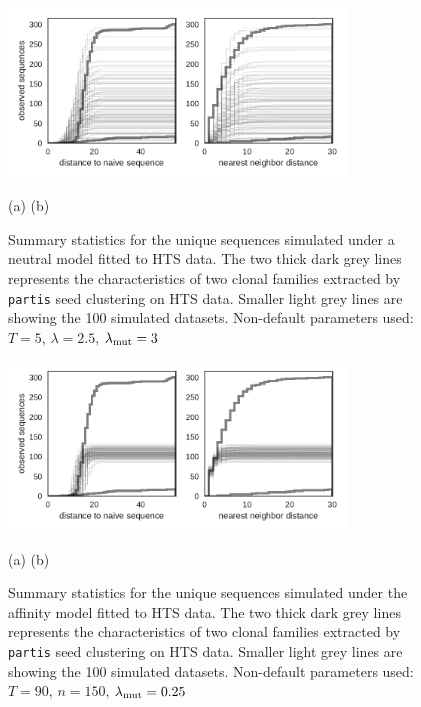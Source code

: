 \begin{figure}[!ht]
    \begin{center}
    \includegraphics[width=0.8\textwidth]{figures/Laura-neutsim_Laura-data.pdf}\newline%
    \end{center}
    \vspace{-14mm} \hspace{44mm} (a) \hspace{50mm} (b)
    \caption{
        \label{fig:Laura-neutsim_Laura-data}
        Summary statistics for the unique sequences simulated under a neutral model fitted to HTS data.
        The two thick dark grey lines represents the characteristics of two clonal families extracted by \texttt{partis} seed clustering on HTS data.
        Smaller light grey lines are showing the 100 simulated datasets.
        Non-default parameters used: $T=5$, $\lambda=2.5$, $\lambda_{\text{mut}}=3$
    }
\end{figure}
\clearpage
\begin{figure}[!ht]
    \begin{center}
    \includegraphics[width=0.8\textwidth]{figures/Laura-affsim_Laura-data.pdf}\newline%
    \end{center}
    \vspace{-14mm} \hspace{44mm} (a) \hspace{50mm} (b)
    \caption{
        \label{fig:Laura-affsim_Laura-data}
        Summary statistics for the unique sequences simulated under the affinity model fitted to HTS data.
        The two thick dark grey lines represents the characteristics of two clonal families extracted by \texttt{partis} seed clustering on HTS data.
        Smaller light grey lines are showing the 100 simulated datasets.
        Non-default parameters used: $T=90$, $n=150$, $\lambda_{\text{mut}}=0.25$
    }
\end{figure}


